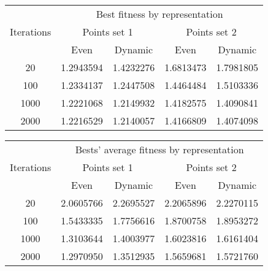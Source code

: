 \begin{center}
	\begin{tabular}{|c|c|c|c|c|}
		\hline
		\multirow{3}{*}{Iterations}	&	\multicolumn{4}{c|}{Best fitness by representation}	\\
										\cline{2-5}
									&	\multicolumn{2}{c|}{Points set 1}	& \multicolumn{2}{c|}{Points set 2} \\
										\cline{2-5}
									&	Even			&	Dynamic			&	Even			&	Dynamic		\\
		\hline								
		20							& 1.2943594 \cellcolor[gray]{0.9}		& 1.4232276			& 1.6813473 \cellcolor[gray]{0.9}		& 1.7981805		\\
		\hline
		100							& 1.2334137 \cellcolor[gray]{0.9}		& 1.2447508 		& 1.4464484 \cellcolor[gray]{0.9}		& 1.5103336		\\
		\hline
		1000						& 1.2221068 		& 1.2149932 \cellcolor[gray]{0.9}		& 1.4182575 		& 1.4090841	\cellcolor[gray]{0.9}	\\
		\hline
		2000						& 1.2216529 		& 1.2140057 \cellcolor[gray]{0.9}		& 1.4166809 		& 1.4074098	\cellcolor[gray]{0.9}	\\
		\hline
	\end{tabular}
	\label{tab:selection_type}
\end{center}

\begin{center}
	\begin{tabular}{|c|c|c|c|c|}
		\hline
		\multirow{3}{*}{Iterations}	&	\multicolumn{4}{c|}{Bests' average fitness by representation}	\\
										\cline{2-5}
									&	\multicolumn{2}{c|}{Points set 1}	& \multicolumn{2}{c|}{Points set 2} \\
										\cline{2-5}
									&	Even			&	Dynamic			&	Even			&	Dynamic		\\
	\hline								
	20								&	2.0605766  \cellcolor[gray]{0.9}		&	2.2695527		&	2.2065896  \cellcolor[gray]{0.9}		&	2.2270115	\\
	\hline
	100								&	1.5433335  \cellcolor[gray]{0.9}		&	1.7756616		&	1.8700758  \cellcolor[gray]{0.9}		&	1.8953272	\\
	\hline
	1000 							&	1.3103644  \cellcolor[gray]{0.9}		&	1.4003977		&	1.6023816  \cellcolor[gray]{0.9}		&	1.6161404	\\
	\hline
	2000							&	1.2970950  \cellcolor[gray]{0.9}		&	1.3512935		&	1.5659681  \cellcolor[gray]{0.9}		&	1.5721760	\\
	\hline
	\end{tabular}
	\label{tab:selection_type}
\end{center}
